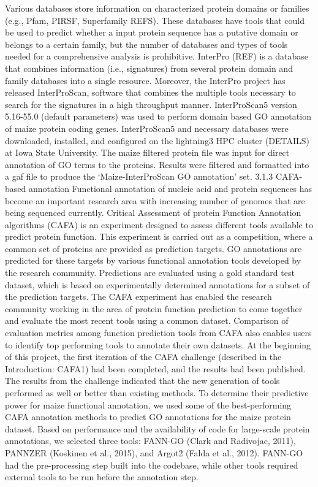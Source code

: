 Various databases store information on characterized protein domains or families (e.g., Pfam, PIRSF, Superfamily REFS). These databases have tools that could be used to predict whether a input protein sequence has a putative domain or belongs to a certain family, but the number of databases and types of tools needed for a comprehensive analysis is prohibitive. InterPro (REF) is a database that combines information (i.e., signatures) from several protein domain and family databases into a single resource. Moreover, the InterPro project has released InterProScan, software that combines the multiple tools necessary to search for the signatures in a high throughput manner.
InterProScan5 version 5.16-55.0 (default parameters) was used to perform domain based GO annotation of maize protein coding genes. InterProScan5 and necessary databases were downloaded, installed, and configured on the lightning3 HPC cluster (DETAILS) at Iowa State University. The maize filtered protein file was input for direct annotation of GO terms to the proteins. Results were filtered and formatted into a gaf file to produce the ‘Maize-InterProScan GO annotation’ set.
3.1.3 CAFA-based annotation
Functional annotation of nucleic acid and protein sequences has become an important research area with increasing number of genomes that are being sequenced currently. Critical Assessment of protein Function Annotation algorithms (CAFA) is an experiment designed to assess different tools available to predict protein function. This experiment is carried out as a competition, where a common set of proteins are provided as prediction targets. GO annotations are predicted for these targets by various functional annotation tools developed by the research community. Predictions are evaluated using a gold standard test dataset, which is based on experimentally determined annotations for a subset of the prediction targets. The CAFA experiment has enabled the research community working in the area of protein function prediction to come together and evaluate the most recent tools using a common dataset. Comparison of evaluation metrics among function prediction tools from CAFA also enables users to identify top performing tools to annotate their own datasets.
At the beginning of this project, the first iteration of the CAFA challenge (described in the Introduction: CAFA1) had been completed, and the results had been published. The results from the challenge indicated that the new generation of tools performed as well or better than existing methods. To determine their predictive power for maize functional annotation, we used some of the best-performing CAFA annotation methods to predict GO annotations for the maize protein dataset. Based on performance and the availability of code for large-scale protein annotations, we selected three tools: FANN-GO (Clark and Radivojac, 2011), PANNZER (Koskinen et al., 2015), and Argot2 (Falda et al., 2012). FANN-GO had the pre-processing step built into the codebase, while other tools required external tools to be run before the annotation step.
